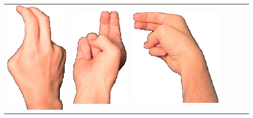 \documentclass{article}
\begin{document}
\begin{center}
\begin{tabular}{r*{6}{c}}
\includegraphics[scale=0.1]{images/02-04-3.jpg}&
\includegraphics[scale=0.1]{images/02-04-4.jpg}&
\includegraphics[scale=0.1]{images/02-04-5.jpg}&

\end{tabular}
\end{center}
\end{document}
